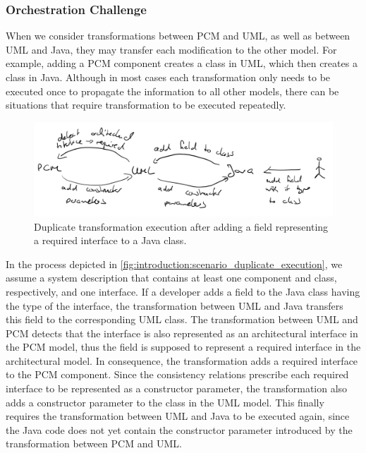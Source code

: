 \subsubsection*{Orchestration Challenge}

When we consider transformations between \gls{PCM} and \gls{UML}, as well as between \gls{UML} and Java, they may transfer each modification to the other model.
For example, adding a \gls{PCM} component creates a class in \gls{UML}, which then creates a class in Java.
Although in most cases each transformation only needs to be executed once to propagate the information to all other models, there can be situations that require transformation to be executed repeatedly.

\begin{figure}
    \centering
    \includegraphics[width=\textwidth]{figures/prologue/introduction/scenario_duplicate_execution.png}
    \caption[Example for transformation orchestration]{Duplicate transformation execution after adding a field representing a required interface to a Java class.}
    \label{fig:introduction:scenario_duplicate_execution}
\end{figure}

In the process depicted in \autoref{fig:introduction:scenario_duplicate_execution}, we assume a system description that contains at least one component and class, respectively, and one interface.
If a developer adds a field to the Java class having the type of the interface, the transformation between \gls{UML} and Java transfers this field to the corresponding \gls{UML} class.
The transformation between \gls{UML} and \gls{PCM} detects that the interface is also represented as an architectural interface in the \gls{PCM} model, thus the field is supposed to represent a required interface in the architectural model.
In consequence, the transformation adds a required interface to the \gls{PCM} component.
Since the consistency relations prescribe each required interface to be represented as a constructor parameter, the transformation also adds a constructor parameter to the class in the \gls{UML} model.
This finally requires the transformation between \gls{UML} and Java to be executed again, since the Java code does not yet contain the constructor parameter introduced by the transformation between \gls{PCM} and \gls{UML}.

